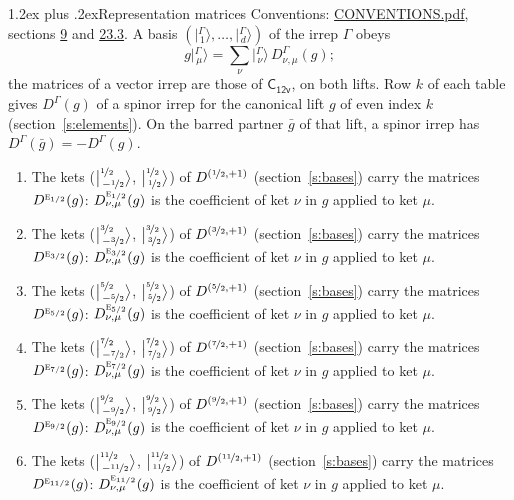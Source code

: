 \documentclass[10pt,a4paper]{article}
\makeatletter
\renewcommand\section{\@startsection{section}{1}{\z@}{-3ex plus -1ex minus -.2ex}%
  {1.2ex plus .2ex}{\normalfont\large\sffamily\bfseries\color{parttitle}}}
\numberwithin{equation}{section}
\newcommand{\grp}[1]{\mathsf{#1}}
\newcommand{\irr}[1]{\text{\normalfont\scshape #1}}
\newcommand{\irrJp}[2]{D^{(#1,#2)}}
\newcommand{\repD}[1]{D^{#1}}
\newcommand{\intx}{\mu}
\newcommand{\jm}[2]{\bigl\lvert{}^{#1}_{\,#2}\bigr\rangle}
\newcommand{\irket}[2]{\bigl\lvert{}^{#1}_{\,#2}\bigr\rangle}
\newcommand{\barred}[1]{\bar{#1}}
\newenvironment{romanlist}{\begin{enumerate}%
\renewcommand{\labelenumi}{(\roman{enumi})}}%
  {\end{enumerate}}
\makeatother
\begin{document}
\section{Representation matrices}\label{s:irrep_matrices}
Conventions: \href{../../CONVENTIONS.pdf}{CONVENTIONS.pdf}, sections \href{../../../rotation/CONVENTIONS.pdf\#conv.9}{9} and \href{../../CONVENTIONS.pdf\#conv.23.3}{23.3}.
\leavevmode\label{n:vector.ket.partner}\label{n:index.partner}\label{n:matrix.irrep}\label{n:index.partner.summed}A basis $(\irket{\Gamma}{1}, \dots, \irket{\Gamma}{d})$ of the irrep $\Gamma$ obeys
\begin{equation}\label{e:partner}g\irket{\Gamma}{\intx} = \sum_\nu \irket{\Gamma}{\nu}\, \repD{\Gamma}_{\nu,\intx}(g);\end{equation}
the matrices of a vector irrep are those of \href{../../../rotation/data/pdf/C12v.pdf}{$\grp{C_{12v}}$}, on both lifts. Row $k$ of each table gives $\repD{\Gamma}(g)$ of a spinor irrep for the canonical lift $g$ of even index $k$ (section~\ref{s:elements}). On the barred partner $\barred{g}$ of that lift, a spinor irrep has $\repD{\Gamma}(\barred{g}) = -\repD{\Gamma}(g)$.
\begin{romanlist}\raggedright
\item The kets ($\jm{\nicefrac{1}{2}}{-\nicefrac{1}{2}}$, $\jm{\nicefrac{1}{2}}{\nicefrac{1}{2}}$) of $\irrJp{\nicefrac{1}{2}}{+1}$ (section~\ref{s:bases}) carry the matrices $\repD{\irr{e}_{1/2}}(g)$: $\repD{\irr{e}_{1/2}}_{\nu,\intx}(g)$ is the coefficient of ket $\nu$ in $g$ applied to ket $\intx$.
\item The kets ($\jm{\nicefrac{3}{2}}{-\nicefrac{3}{2}}$, $\jm{\nicefrac{3}{2}}{\nicefrac{3}{2}}$) of $\irrJp{\nicefrac{3}{2}}{+1}$ (section~\ref{s:bases}) carry the matrices $\repD{\irr{e}_{3/2}}(g)$: $\repD{\irr{e}_{3/2}}_{\nu,\intx}(g)$ is the coefficient of ket $\nu$ in $g$ applied to ket $\intx$.
\item The kets ($\jm{\nicefrac{5}{2}}{-\nicefrac{5}{2}}$, $\jm{\nicefrac{5}{2}}{\nicefrac{5}{2}}$) of $\irrJp{\nicefrac{5}{2}}{+1}$ (section~\ref{s:bases}) carry the matrices $\repD{\irr{e}_{5/2}}(g)$: $\repD{\irr{e}_{5/2}}_{\nu,\intx}(g)$ is the coefficient of ket $\nu$ in $g$ applied to ket $\intx$.
\item The kets ($\jm{\nicefrac{7}{2}}{-\nicefrac{7}{2}}$, $\jm{\nicefrac{7}{2}}{\nicefrac{7}{2}}$) of $\irrJp{\nicefrac{7}{2}}{+1}$ (section~\ref{s:bases}) carry the matrices $\repD{\irr{e}_{7/2}}(g)$: $\repD{\irr{e}_{7/2}}_{\nu,\intx}(g)$ is the coefficient of ket $\nu$ in $g$ applied to ket $\intx$.
\item The kets ($\jm{\nicefrac{9}{2}}{-\nicefrac{9}{2}}$, $\jm{\nicefrac{9}{2}}{\nicefrac{9}{2}}$) of $\irrJp{\nicefrac{9}{2}}{+1}$ (section~\ref{s:bases}) carry the matrices $\repD{\irr{e}_{9/2}}(g)$: $\repD{\irr{e}_{9/2}}_{\nu,\intx}(g)$ is the coefficient of ket $\nu$ in $g$ applied to ket $\intx$.
\item The kets ($\jm{\nicefrac{11}{2}}{-\nicefrac{11}{2}}$, $\jm{\nicefrac{11}{2}}{\nicefrac{11}{2}}$) of $\irrJp{\nicefrac{11}{2}}{+1}$ (section~\ref{s:bases}) carry the matrices $\repD{\irr{e}_{11/2}}(g)$: $\repD{\irr{e}_{11/2}}_{\nu,\intx}(g)$ is the coefficient of ket $\nu$ in $g$ applied to ket $\intx$.
\end{romanlist}
\end{document}
